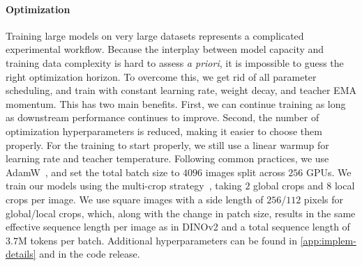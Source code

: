 \paragraph{Optimization}
Training large models on very large datasets represents a complicated experimental workflow.
Because the interplay between model capacity and training data complexity is hard to assess \emph{a priori}, it is impossible to guess the right optimization horizon.
To overcome this, we get rid of all parameter scheduling, and train with constant learning rate, weight decay, and teacher EMA momentum.
This has two main benefits.
First, we can continue training as long as downstream performance continues to improve. %
Second, the number of optimization hyperparameters is reduced, making it easier to choose them properly.
For the training to start properly, we still use a linear warmup for learning rate and teacher temperature. %
Following common practices, we use AdamW~\citep{loshchilov2017decoupled}, and set the total batch size to $4096$ images split across $256$ GPUs.
We train our models using the multi-crop strategy~\citep{caron2020unsupervised}, taking $2$ global crops and $8$ local crops per image.
We use square images with a side length of $256$/$112$ pixels for global/local crops, which, along with the change in patch size, results in the same effective sequence length per image as in DINOv2 and a total sequence length of $3.7$M tokens per batch.
Additional hyperparameters can be found in \cref{app:implem-details} and in the code release.




